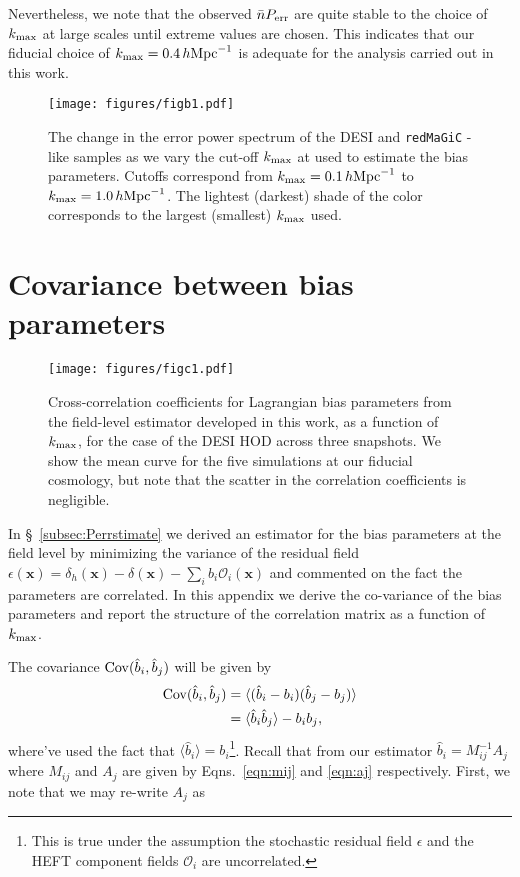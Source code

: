 \documentclass[fleqn,usenatbib]{mnras}
\newcommand{\redmagic}{\texttt{redMaGiC} }
\newcommand{\bx}{\boldsymbol x}
\newcommand{\ihmpc}{\,h{\rm Mpc}^{-1}}
\newcommand{\kmax}{k_{\rm max}}
\begin{document}
Nevertheless, we note that the observed $\bar{n}P_{\rm err}$ are quite stable to the choice of $\kmax$ at large scales until extreme values are chosen. This indicates that our fiducial choice of $\kmax = 0.4 \ihmpc$ is adequate for the analysis carried out in this work. 
\begin{figure}
    \centering
    \texttt{[image: figures/figb1.pdf]}
    \caption{The change in the error power spectrum of the DESI and \redmagic-like samples as we vary the cut-off $k_{\rm max}$ at used to estimate the bias parameters. Cutoffs correspond from $k_{\rm max} = 0.1 \ihmpc$ to $k_{\rm max} = 1.0 \ihmpc$. The lightest (darkest) shade of the color corresponds to the largest (smallest) $k_{\rm max}$ used. }
    \label{fig:kstarvary}
\end{figure}
\section{Covariance between bias parameters}
\label{appendix:C}
\begin{figure*}
    \centering
    \texttt{[image: figures/figc1.pdf]}
    \caption{Cross-correlation coefficients for Lagrangian bias parameters from the field-level estimator developed in this work, as a function of $\kmax$, for the case of the DESI HOD across three snapshots. We show the mean curve for the five simulations at our fiducial cosmology, but note that the scatter in the correlation coefficients is negligible. }
    \label{fig:biascorr}
\end{figure*}
In \S~\ref{subsec:Perrstimate} we derived an estimator for the bias parameters at the field level by minimizing the variance of the residual field $\epsilon (\bx) = \delta_h (\bx) - \delta(\bx) - \sum_i b_i \mathcal{O}_i (\bx)$ and commented on the fact the parameters are correlated. In this appendix we derive the co-variance of the bias parameters and report the structure of the correlation matrix as a function of $\kmax$. \par 
The covariance ${\rm Cov}(\hat{b}_i,\hat{b}_j)$ will be given by
\begin{align}
   {\rm Cov}(\hat{b}_i,\hat{b}_j) &= \langle (\hat{b}_i - b_i) (\hat{b}_j - b_j) \rangle  \\
   &= \langle \hat{b}_i \hat{b}_j \rangle - b_i b_j,
\end{align}
where've used the fact that $\langle \hat{b}_i \rangle = b_i$\footnote{This is true under the assumption the stochastic residual field $\epsilon$ and the HEFT component fields $\mathcal{O}_i$ are uncorrelated.}. Recall that from our estimator $\hat{b}_i = M_{ij}^{-1} A_j$ where $M_{ij}$ and $A_j$ are given by Eqns.~\ref{eqn:mij} and \ref{eqn:aj} respectively. First, we note that we may re-write $A_j$ as 
\end{document}

